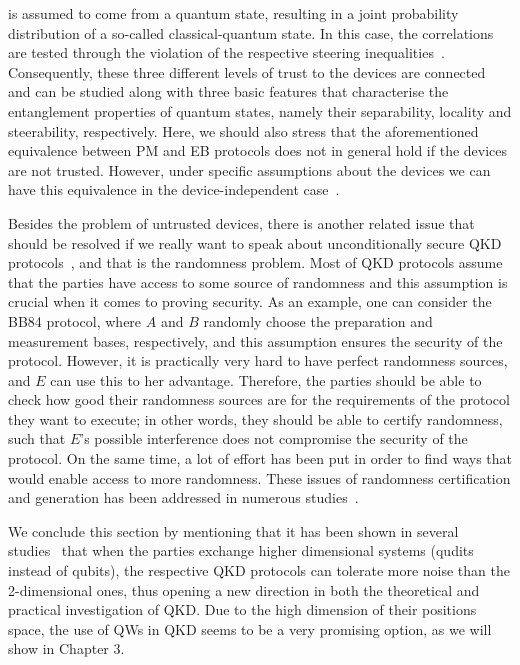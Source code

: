 is assumed to come from a quantum state, resulting in a joint probability distribution of a so-called classical-quantum state. In this case, the correlations are tested through the violation of the respective steering inequalities~\cite{wis:jon:doh:07,jon:wis:doh:07,he:dru:rei:11,skr:cav:15,skr:cav:17,cav:he:rei:wis:11,he:rei:13,rei:dru:bow:cav:lam:bac:and:leu:09,bra:cav:wal:sca:wis:12}. Consequently, these three different levels of trust to the devices are connected and can be studied along with three basic features that characterise the entanglement properties of quantum states, namely their separability, locality and steerability, respectively. Here, we should also stress that the aforementioned equivalence between PM and EB protocols does not in general hold if the devices are not trusted. However, under specific assumptions about the devices we can have this equivalence in the device-independent case~\cite{woo:pir:15}.

Besides the problem of untrusted devices, there is another related issue that should be resolved if we really want to speak about unconditionally secure QKD protocols~\cite{beaudry:15}, and that is the randomness problem. Most of QKD protocols assume that the parties have access to some source of randomness and this assumption is crucial when it comes to proving security. As an example, one can consider the BB84 protocol, where $A$ and $B$  randomly choose the preparation and measurement bases, respectively, and this assumption ensures the security of the protocol. However, it is practically very hard to have perfect randomness sources, and $E$ can use this to her advantage. Therefore, the parties should be able to check how good their randomness sources are for the requirements of the protocol they want to execute; in other words, they should be able to certify randomness, such that $E$'s possible interference does not compromise the security of the protocol. On the same time, a lot of effort has been put in order to find ways that would enable access to more randomness. These issues of randomness certification and generation has been addressed in numerous studies~\cite{pir:aci:mas:gir:boy:mat:mau:olm:hay:luo:man:mon:10,aci:mas:pir:12,mat:skr:bra:cav:aci:15,aci:pir:ver:wit:16,aci:mas:16,and:bad:dum:cab:18}.

We conclude this section by mentioning that it has been shown in several studies~\cite{bec:tit:00,cer:bou:kar:gis:02,bru:chr:eke:eng:ber:kas:mac:03,nik:alb:05,she:sca:10,cha:15} that when the parties exchange higher dimensional systems (qudits instead of qubits), the respective QKD protocols can tolerate more noise than the 2-dimensional ones, thus opening a new direction in both the theoretical and practical investigation of QKD. Due to the high dimension of their positions space, the use of QWs in QKD seems to be a very promising option, as we will show in Chapter 3.


